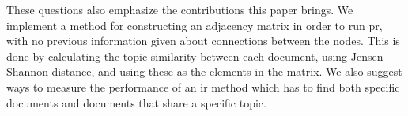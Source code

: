 These questions also emphasize the contributions this paper brings.
We implement a method for constructing an adjacency matrix in order to run \gls{pr}, with no previous information given about connections between the nodes.
This is done by calculating the topic similarity between each document, using Jensen-Shannon distance, and using these as the elements in the matrix.
We also suggest ways to measure the performance of an \gls{ir} method which has to find both specific documents and documents that share a specific topic.
